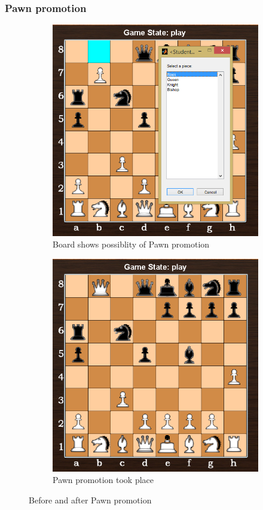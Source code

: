 \documentclass[11pt,a4paper]{article}
\begin{document}
\subsubsection{Pawn promotion}
\begin{figure}[H]
\centering
\begin{subfigure}{0.5\textwidth}
  \centering
  \includegraphics[width=0.91\linewidth]{Pawnpromo1}
  \caption{Board shows possiblity of Pawn promotion}
  \label{fig:sub1}
\end{subfigure}%
\begin{subfigure}{0.5\textwidth}
  \centering
  \includegraphics[width=0.9\linewidth]{Pawnpromo2}
  \caption{Pawn promotion took place}
  \label{fig:sub2}
\end{subfigure}
\caption{Before and after Pawn promotion}
\label{fig:test}
\end{figure}
\end{document}
